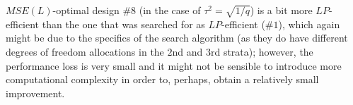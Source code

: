 $MSE(L)$-optimal design \#$8$ (in the case of $\tau^2=\sqrt{1/q}$) is a bit more $LP$-efficient than the one that was searched for as $LP$-efficient (\#$1$), which again might be due to the specifics of the search algorithm (as they do have different degrees of freedom allocations in the $2$nd and $3$rd strata); however, the performance loss is very small and it might not be sensible to introduce more computational complexity in order to, perhaps, obtain a relatively small improvement.    
  
  